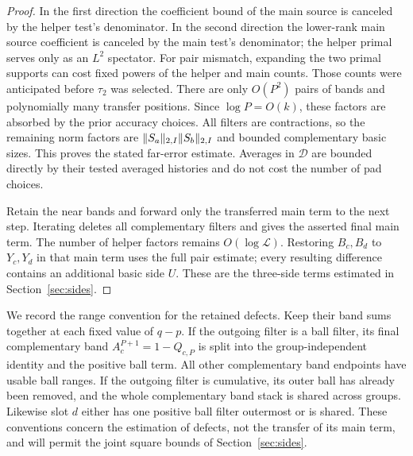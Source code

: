 \begin{proof}
In the first direction the coefficient bound of the main source is
canceled by the helper test's denominator.  In the second direction
the lower-rank main source coefficient is canceled by the main test's
denominator; the helper primal serves only as an $L^2$ spectator.
For pair mismatch, expanding the two primal supports can cost fixed
powers of the helper and main counts.  Those counts were anticipated
before $\tau_2$ was selected.  There are only $O(P^2)$ pairs of bands
and polynomially many transfer positions.  Since $\log P=O(k)$, these
factors are absorbed by the prior accuracy choices.  All filters are
contractions, so the remaining norm factors are
$\lVert S_a\rVert_{2,I}\lVert S_b\rVert_{2,I}$ and bounded complementary basic
sizes.  This proves the stated far-error estimate.  Averages in
$\mathcal D$ are bounded directly by their tested averaged histories
and do not cost the number of pad choices.

Retain the near bands and forward only the transferred main term to
the next step.  Iterating deletes all complementary filters and gives
the asserted final main term.  The number of helper factors remains
$O(\log\mathcal L)$.  Restoring $B_c,B_d$ to $Y_c,Y_d$ in that main
term uses the full pair estimate; every resulting difference contains
an additional basic side $U$.  These are the three-side terms estimated
in Section~\ref{sec:sides}.
\end{proof}

We record the range convention for the retained defects.  Keep their
band sums together at each fixed value of $q-p$.  If the outgoing filter
is a ball filter, its final complementary band
$A_c^{P+1}=1-Q_{c,P}$ is split into the group-independent identity and
the positive ball term.  All other complementary band endpoints have
usable ball ranges.  If the outgoing filter is cumulative, its outer
ball has already been removed, and the whole complementary band stack
is shared across groups.  Likewise slot $d$ either has one positive
ball filter outermost or is shared.  These conventions concern the
estimation of defects, not the transfer of its main term, and will
permit the joint square bounds of Section~\ref{sec:sides}.
